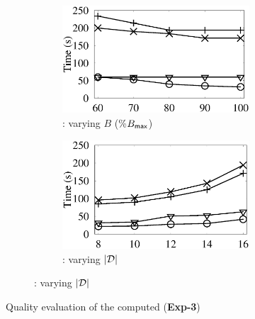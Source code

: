 \begin{figure}[tb!]
\begin{subfigure}[b]{1.00\textwidth}
  		\begin{subfigure}[b]{0.256\textwidth}
          \centering
          \includegraphics[width=1\textwidth]{fig/vary_b_tpcds.eps}
          \begin{center}
            \vspace{-2ex}\caption{\tpcds: varying $B$ (\%$B_{\protect\mathsf{max}}$)}
            \label{tpcds-1-varyB}
          \end{center}
          \vspace{-1ex}
        \end{subfigure}
         \hspace{-2.8ex}
  		\begin{subfigure}[b]{0.256\textwidth}
          \centering
          \includegraphics[width=1\textwidth]{fig/vary_d_tpcds.eps}
          \begin{center}
            \vspace{-2ex}
           \caption{\tpcds: varying $|\mathcal D|$}
            \label{tpcds-1-varyD}
          \end{center}
        \end{subfigure}
\end{subfigure}
\vspace{-4.0ex}
\caption{Quality evaluation of the computed \bdss ({\bf Exp-3})}
\label{exp-quality}
\vspace{-2.5ex}
\end{figure}
